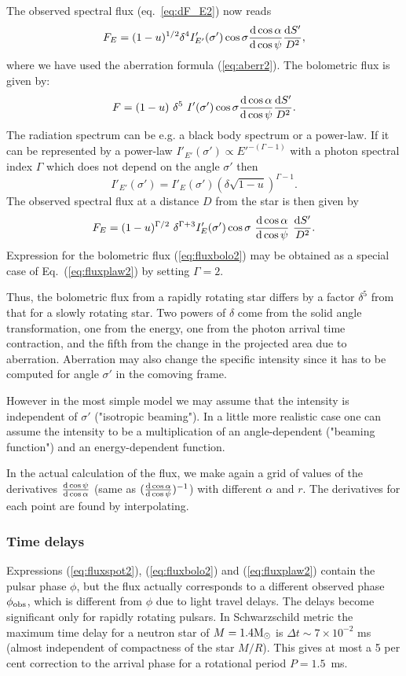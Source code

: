 \documentclass{wihuri}
\def\be{\begin{equation}}
\def\ee{\end{equation}}
\def\msun{{\rm M_{\odot}}}
\def\d{{\rm d}}
\def\Dop{\delta}
\def\phiobs{\phi_{\rm obs}}
\begin{document}
The observed spectral flux (eq.~\ref{eq:dF_E2}) now reads
\be \label{eq:fluxspot2}
F_{E}=(1-u)^{1/2} \Dop^{4} I'_{E'}(\sigma') \cos\sigma
\frac{\d \cos\alpha}{\d\cos\psi}
 \frac{\d S'}{D^2} ,
\ee
where we have used the aberration formula (\ref{eq:aberr2}).
The bolometric flux is given by:
\be  \label{eq:fluxbolo2}
F= (1-u)\ \Dop^5 \
I'(\sigma')  \cos\sigma \frac{\d\cos\alpha}{\d\cos\psi} \frac{\d S'}{D^2} .
\ee
The radiation spectrum can be e.g. a black body spectrum or a power-law. If it can be represented by
a power-law $I'_{E'}(\sigma') \propto E '^{-(\Gamma-1)}$
with a photon spectral index
$\Gamma$ which does not depend on the angle $\sigma'$ then
\be \label{eq:int_trans2}
I'_{E'}(\sigma') = I'_{E}(\sigma')
\left( \Dop \sqrt{1-u} \right)^{\Gamma-1} .
\ee
The observed spectral flux at a distance $D$ from the star is then given by 
\be\label{eq:fluxplaw2}
 F_{E}= (1-u)^{\Gamma/2}\ \Dop^{\Gamma+3} I'_E(\sigma')
\cos\sigma\ \frac{\d\cos\alpha}{\d\cos\psi}\ \frac{\d S'}{D^2}.
\ee
Expression for the bolometric flux (\ref{eq:fluxbolo2})
may be obtained as a special case of Eq.~(\ref{eq:fluxplaw2}) by setting $\Gamma=2$. 

Thus, the bolometric flux from a rapidly rotating star differs by a factor  $\Dop^5$
from that for a slowly rotating star. Two powers of $\Dop$ come
from the solid angle transformation, one from the energy, one from the
photon arrival time contraction,
and the fifth from the change in the projected  area due to  aberration.
Aberration may also change the specific intensity since it has to be computed
for angle $\sigma'$ in the comoving frame. 

However in the most simple model we may assume that the intensity is independent of $\sigma'$ ("isotropic beaming"). In a little more realistic case one can assume the intensity to be a multiplication of an angle-dependent ("beaming function") and an energy-dependent function.

In the actual calculation of the flux, we make again a grid of values of the derivatives $\frac{\d\cos\psi}{\d\cos\alpha}$ (same as $(\frac{\d\cos\alpha}{\d\cos\psi})^{-1}$) with different $\alpha$ and $r$. The derivatives for each point are found by interpolating. 


\subsubsection{Time delays}



Expressions (\ref{eq:fluxspot2}), (\ref{eq:fluxbolo2}) and (\ref{eq:fluxplaw2}) 
contain the pulsar phase $\phi$, but the flux actually corresponds to a different 
observed phase $\phiobs$, which is different from $\phi$ due to light travel delays.  
The delays become significant only for rapidly rotating pulsars.
In Schwarzschild metric the maximum time delay for a neutron star
of $M=1.4\msun$ is $\Delta t\sim 7\times 10^{-2}$ ms (almost independent
of compactness of the star $M/R$). This gives at most 
a 5 per cent correction to the arrival phase for a rotational period $P=1.5$~ms.
\end{document}
